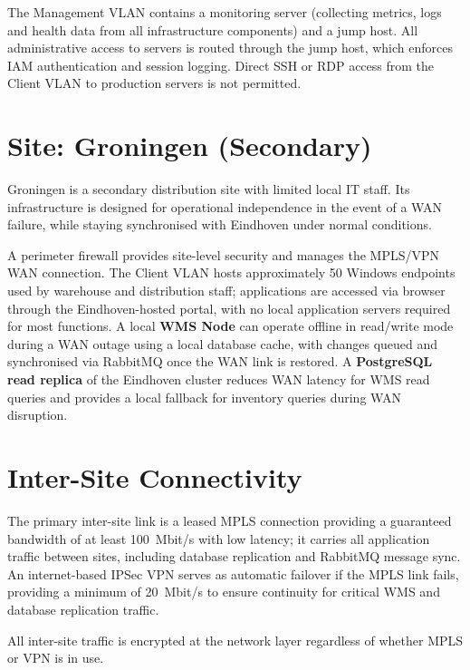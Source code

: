 The Management VLAN contains a monitoring server (collecting metrics, logs and health data from all infrastructure components) and a jump host. All administrative access to servers is routed through the jump host, which enforces IAM authentication and session logging. Direct SSH or RDP access from the Client VLAN to production servers is not permitted.

\section{Site: Groningen (Secondary)}

Groningen is a secondary distribution site with limited local IT staff. Its infrastructure is designed for operational independence in the event of a WAN failure, while staying synchronised with Eindhoven under normal conditions.

A perimeter firewall provides site-level security and manages the MPLS/VPN WAN connection. The Client VLAN hosts approximately 50 Windows endpoints used by warehouse and distribution staff; applications are accessed via browser through the Eindhoven-hosted portal, with no local application servers required for most functions. A local \textbf{WMS Node} can operate offline in read/write mode during a WAN outage using a local database cache, with changes queued and synchronised via RabbitMQ once the WAN link is restored. A \textbf{PostgreSQL read replica} of the Eindhoven cluster reduces WAN latency for WMS read queries and provides a local fallback for inventory queries during WAN disruption.

\section{Inter-Site Connectivity}

The primary inter-site link is a leased MPLS connection providing a guaranteed bandwidth of at least 100~Mbit/s with low latency; it carries all application traffic between sites, including database replication and RabbitMQ message sync. An internet-based IPSec VPN serves as automatic failover if the MPLS link fails, providing a minimum of 20~Mbit/s to ensure continuity for critical WMS and database replication traffic.

All inter-site traffic is encrypted at the network layer regardless of whether MPLS or VPN is in use.

